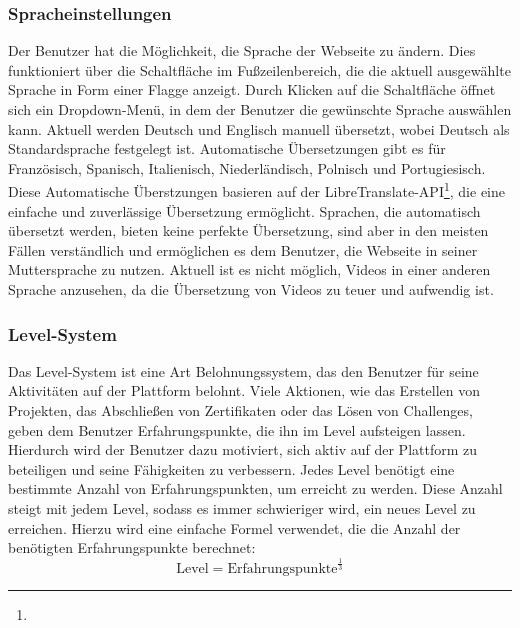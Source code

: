 \documentclass[main.tex]{subfiles}
\begin{document}
    \subsubsection{Spracheinstellungen}
    Der Benutzer hat die Möglichkeit, die Sprache der Webseite zu ändern.
    Dies funktioniert über die Schaltfläche im Fußzeilenbereich, die die aktuell ausgewählte Sprache in Form einer Flagge anzeigt.
    Durch Klicken auf die Schaltfläche öffnet sich ein Dropdown-Menü, in dem der Benutzer die gewünschte Sprache auswählen kann.
    Aktuell werden Deutsch und Englisch manuell übersetzt, wobei Deutsch als Standardsprache festgelegt ist.
    Automatische Übersetzungen gibt es für Französisch, Spanisch, Italienisch, Niederländisch, Polnisch und Portugiesisch.
    Diese Automatische Überstzungen basieren auf der LibreTranslate-API\footnote{}, die eine einfache und zuverlässige Übersetzung ermöglicht.
    Sprachen, die automatisch übersetzt werden, bieten keine perfekte Übersetzung, sind aber in den meisten Fällen verständlich und ermöglichen es dem Benutzer, die Webseite in seiner Muttersprache zu nutzen.
    Aktuell ist es nicht möglich, Videos in einer anderen Sprache anzusehen, da die Übersetzung von Videos zu teuer und aufwendig ist.
    \subsubsection{Level-System}
    Das Level-System ist eine Art Belohnungssystem, das den Benutzer für seine Aktivitäten auf der Plattform belohnt.
    Viele Aktionen, wie das Erstellen von Projekten, das Abschließen von Zertifikaten oder das Lösen von Challenges, geben dem Benutzer Erfahrungspunkte, die ihn im Level aufsteigen lassen.
    Hierdurch wird der Benutzer dazu motiviert, sich aktiv auf der Plattform zu beteiligen und seine Fähigkeiten zu verbessern.
    Jedes Level benötigt eine bestimmte Anzahl von Erfahrungspunkten, um erreicht zu werden.
    Diese Anzahl steigt mit jedem Level, sodass es immer schwieriger wird, ein neues Level zu erreichen.
    Hierzu wird eine einfache Formel verwendet, die die Anzahl der benötigten Erfahrungspunkte berechnet:
    \begin{equation}
        \text{Level} = \text{Erfahrungspunkte}^{\frac{1}{3}}
    \end{equation}
\end{document}
